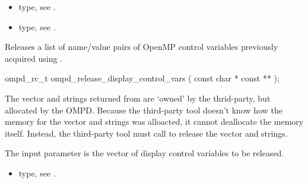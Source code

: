 \crossreferences
\begin{itemize}
	\item {} type, see .
	\item {} type, see .
\end{itemize}


\label{ompd:ompd_release_display_control_vars}
\label{sec:ompd_release_display_control_vars}
\summary

Releases a list of name/value pairs of OpenMP control variables
previously acquired using .
\format
\begin{cspecific}
\begin{ompSyntax}
ompd_rc_t ompd_release_display_control_vars (
  const char * const **
);
\end{ompSyntax}
\end{cspecific}

\descr
The vector and strings returned from 
are `owned' by the thrid-party, but allocated by the OMPD.
Because the third-party tool doesn't know how the memory for the vector
and strings was alloacted, it cannot deallocate the memory itself.
Instead, the third-party tool must call
 to release the vector
and strings.

\argdesc
The input parameter  is the vector of display control variables to be released.

\crossreferences
\begin{itemize}
	\item {} type, see .
\end{itemize}
